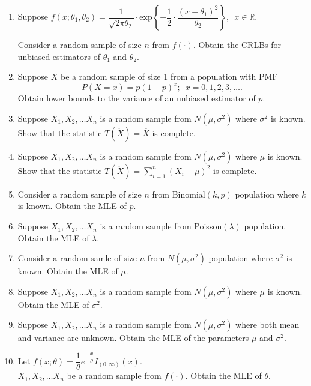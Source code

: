 \documentclass[11pt, a4paper]{article}
\begin{document}
\begin{enumerate}
\item Suppose $f(x; \theta_1, \theta_2) = \dfrac{1}{\sqrt{2 \pi \theta_2}} \cdot \text{exp}\left\{ -\dfrac{1}{2} \cdot \dfrac{(x - \theta_1)^2}{\theta_2}\right\}, \,\,\, x \in \mathbb{R}$. \\

\vspace{0.2cm}

Consider a random sample of size $n$ from $f(\cdot)$. Obtain the CRLBs for unbiased estimators of $\theta_1$ and $\theta_2$.

\item Suppose $X$ be a random sample of size 1 from a population with PMF $$P(X = x) = p(1-p)^x; \,\,\, x = 0, 1, 2, 3, \ldots.$$ Obtain lower bounds to the variance of an unbiased estimator of $p$.

\item Suppose $X_1, X_2, \ldots X_n$ is a random sample from $N(\mu, \sigma^2)$ where $\sigma^2$ is known. Show that the statistic $T(\utilde{X}) = \overline{X}$ is complete.

\item Suppose $X_1, X_2, \ldots X_n$ is a random sample from $N(\mu, \sigma^2)$ where $\mu$ is known. Show that the statistic $T(\utilde{X}) = \sum \limits_{i = 1}^{n} (X_i - \mu)^2$ is complete.

\item Consider a random sample of size $n$ from Binomial$(k, p)$ population where $k$ is known. Obtain the MLE of $p$.

\item Suppose $X_1, X_2, \ldots X_n$ is a random sample from Poisson$(\lambda)$ population. Obtain the MLE of $\lambda$.

\item Consider a random samle of size $n$ from $N(\mu, \sigma^2)$ population where $\sigma^2$ is known. Obtain the MLE of $\mu$.

\item Suppose $X_1, X_2, \ldots X_n$ is a random sample from $N(\mu, \sigma^2)$ where $\mu$ is known. Obtain the MLE of $\sigma^2$.

\item Suppose $X_1, X_2, \ldots X_n$ is a random sample from $N(\mu, \sigma^2)$ where both mean and variance are unknown. Obtain the MLE of the parameters $\mu$ and $\sigma^2$.

\item Let $f(x; \theta) = \dfrac{1}{\theta} e^{-\dfrac{x}{\theta}} I_{(0, \infty)}(x)$. \\

$X_1, X_2, \ldots X_n$ be a random sample from $f(\cdot)$. Obtain the MLE of $\theta$.

\end{enumerate}
\end{document}

